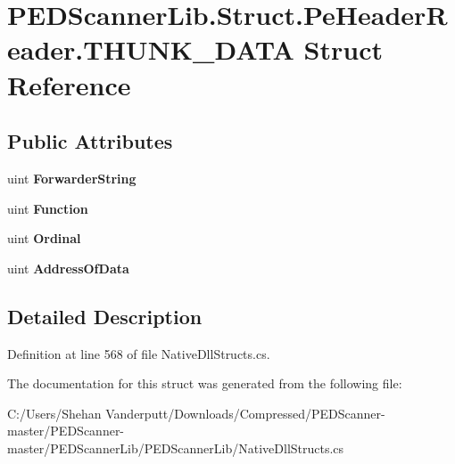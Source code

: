 \hypertarget{struct_p_e_d_scanner_lib_1_1_struct_1_1_pe_header_reader_1_1_t_h_u_n_k___d_a_t_a}{}\section{P\+E\+D\+Scanner\+Lib.\+Struct.\+Pe\+Header\+Reader.\+T\+H\+U\+N\+K\+\_\+\+D\+A\+TA Struct Reference}
\label{struct_p_e_d_scanner_lib_1_1_struct_1_1_pe_header_reader_1_1_t_h_u_n_k___d_a_t_a}
\subsection*{Public Attributes}
\begin{DoxyCompactItemize}
\item 
\mbox{\label{struct_p_e_d_scanner_lib_1_1_struct_1_1_pe_header_reader_1_1_t_h_u_n_k___d_a_t_a_af0902812d8d93dff6f3c46e78db5de47}} 
uint {\bfseries Forwarder\+String}
\item 
\mbox{\label{struct_p_e_d_scanner_lib_1_1_struct_1_1_pe_header_reader_1_1_t_h_u_n_k___d_a_t_a_a1587508523e3370dd1a0ee399a8d7ca8}} 
uint {\bfseries Function}
\item 
\mbox{\label{struct_p_e_d_scanner_lib_1_1_struct_1_1_pe_header_reader_1_1_t_h_u_n_k___d_a_t_a_a6257aaca8da11e253ae11e065bc60736}} 
uint {\bfseries Ordinal}
\item 
\mbox{\label{struct_p_e_d_scanner_lib_1_1_struct_1_1_pe_header_reader_1_1_t_h_u_n_k___d_a_t_a_a17d9d3b537f1c268e7e7157208e9406d}} 
uint {\bfseries Address\+Of\+Data}
\end{DoxyCompactItemize}


\subsection{Detailed Description}


Definition at line 568 of file Native\+Dll\+Structs.\+cs.



The documentation for this struct was generated from the following file\+:\begin{DoxyCompactItemize}
\item 
C\+:/\+Users/\+Shehan Vanderputt/\+Downloads/\+Compressed/\+P\+E\+D\+Scanner-\/master/\+P\+E\+D\+Scanner-\/master/\+P\+E\+D\+Scanner\+Lib/\+P\+E\+D\+Scanner\+Lib/Native\+Dll\+Structs.\+cs\end{DoxyCompactItemize}
